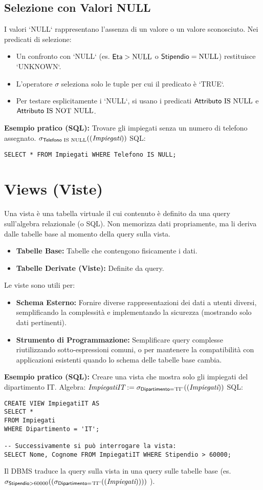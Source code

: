 	\subsection{Selezione con Valori NULL}
	I valori `NULL` rappresentano l'assenza di un valore o un valore sconosciuto.
	Nei predicati di selezione:
	\begin{itemize}
		\item Un confronto con `NULL` (es. $\textsf{Eta} > \text{NULL}$ o $\textsf{Stipendio} = \text{NULL}$) restituisce `UNKNOWN`.
		\item L'operatore $\sigma$ seleziona solo le tuple per cui il predicato è `TRUE`.
		\item Per testare esplicitamente i `NULL`, si usano i predicati $\textsf{Attributo} \text{ IS NULL}$ e $\textsf{Attributo} \text{ IS NOT NULL}$.
	\end{itemize}
	\textbf{Esempio pratico (SQL):} Trovare gli impiegati senza un numero di telefono assegnato.
	$\sigma_{\textsf{Telefono} \text{ IS NULL}}((\textit{Impiegati}))$
	SQL:
	\begin{verbatim}
SELECT * FROM Impiegati WHERE Telefono IS NULL;
	\end{verbatim}
	
	\section{Views (Viste)}
	Una vista è una tabella virtuale il cui contenuto è definito da una query sull'algebra relazionale (o SQL). Non memorizza dati propriamente, ma li deriva dalle tabelle base al momento della query sulla vista.
	\begin{itemize}
		\item \textbf{Tabelle Base:} Tabelle che contengono fisicamente i dati.
		\item \textbf{Tabelle Derivate (Viste):} Definite da query.
	\end{itemize}
	Le viste sono utili per:
	\begin{itemize}
		\item \textbf{Schema Esterno:} Fornire diverse rappresentazioni dei dati a utenti diversi, semplificando la complessità e implementando la sicurezza (mostrando solo dati pertinenti).
		\item \textbf{Strumento di Programmazione:} Semplificare query complesse riutilizzando sotto-espressioni comuni, o per mantenere la compatibilità con applicazioni esistenti quando lo schema delle tabelle base cambia.
	\end{itemize}
	\textbf{Esempio pratico (SQL):} Creare una vista che mostra solo gli impiegati del dipartimento IT.
	Algebra: $\textit{ImpiegatiIT} := \sigma_{\textsf{Dipartimento} = \text{'IT'}}((\textit{Impiegati}))$
	SQL:
	\begin{verbatim}
CREATE VIEW ImpiegatiIT AS
SELECT *
FROM Impiegati
WHERE Dipartimento = 'IT';

-- Successivamente si può interrogare la vista:
SELECT Nome, Cognome FROM ImpiegatiIT WHERE Stipendio > 60000;
	\end{verbatim}
	Il DBMS traduce la query sulla vista in una query sulle tabelle base (es. $\sigma_{\textsf{Stipendio} > 60000}((\sigma_{\textsf{Dipartimento} = \text{'IT'}}((\textit{Impiegati}))))$ ).
	
